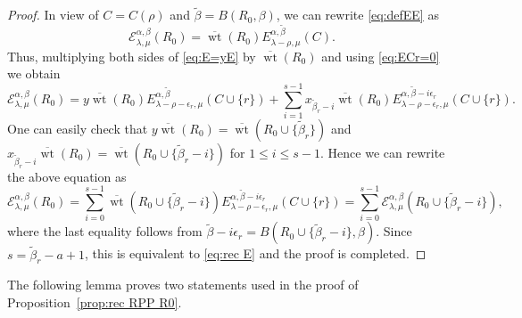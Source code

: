 \documentclass[12pt]{amsart}
\numberwithin{equation}{section}
\theoremstyle{definition}
\newcommand\wb{\widetilde{\beta}}
\newcommand\wt{\operatorname{wt}}
\newcommand\EE{\mathcal{E}}
\newcommand\owt{\overline{\wt}}
\begin{document}
\begin{proof}
In view of $C=C(\rho)$ and $\wb=B(R_0,\beta)$,
we can rewrite \eqref{eq:defEE} as
  \[
  \EE_{\lambda,\mu}^{\alpha,\beta}(R_0) = \owt(R_0) 
  E_{\lambda-\rho,\mu}^{\alpha,\wb}(C).
\]
Thus, multiplying both sides of \eqref{eq:E=yE} by
$\owt(R_0)$ and using \eqref{eq:ECr=0} we obtain
\[
  \EE^{\alpha,\beta}_{\lambda,\mu}(R_0) = y\owt(R_0)
  E^{\alpha,\wb}_{\lambda-\rho-\epsilon_r,\mu}(C\cup\{r\}) + \sum_{i=1}^{s-1}
  x_{\wb_r-i} \owt(R_0) E_{\lambda-\rho-\epsilon_r,\mu}^{\alpha,\wb-i\epsilon_r}(C\cup\{r\}).
  \]
  One can easily check that $y\owt(R_0) = \owt(R_0\cup\{\wb_r\})$ and
  $x_{\wb_r-i} \owt(R_0)=\owt(R_0\cup\{\wb_r-i\})$ for $1\le i\le s-1$. Hence we
  can rewrite the above equation as
\[
  \EE^{\alpha,\beta}_{\lambda,\mu}(R_0) =\sum_{i=0}^{s-1}
  \owt(R_0\cup\{\wb_r-i\})
  E_{\lambda-\rho-\epsilon_r,\mu}^{\alpha,\wb-i\epsilon_r}(C\cup\{r\})
  = \sum_{i=0}^{s-1} \EE^{\alpha,\beta}_{\lambda,\mu}(R_0\cup\{\wb_r-i\}),
\]
where the last equality follows from $\wb-i\epsilon_r =
B(R_0\cup\{\wb_r-i\},\beta)$.
Since $s = \wb_r - a + 1$, this is equivalent to \eqref{eq:rec E} and the
proof is completed.
\end{proof}

The following lemma proves two statements used in the proof of
Proposition~\ref{prop:rec RPP R0}.
\end{document}
